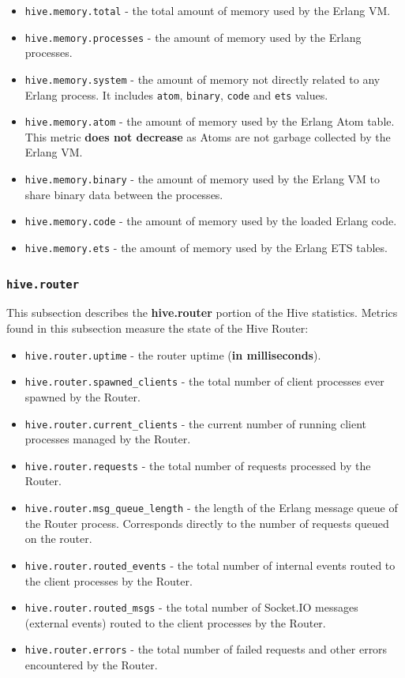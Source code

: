 \documentclass[a4paper]{article}
\begin{document}
\begin{itemize}
\item \texttt{hive.memory.total} - the total amount of memory used by the Erlang VM.
\item \texttt{hive.memory.processes} - the amount of memory used by the Erlang processes.
\item \texttt{hive.memory.system} - the amount of memory not directly related to any Erlang process. It includes \texttt{atom}, \texttt{binary}, \texttt{code} and \texttt{ets} values.
\item \texttt{hive.memory.atom} - the amount of memory used by the Erlang Atom table. This metric \textbf{does not decrease} as Atoms are not garbage collected by the Erlang VM.
\item \texttt{hive.memory.binary} - the amount of memory used by the Erlang VM to share binary data between the processes.
\item \texttt{hive.memory.code} - the amount of memory used by the loaded Erlang code.
\item \texttt{hive.memory.ets} - the amount of memory used by the Erlang ETS tables.
\end{itemize}
\subsubsection{\texttt{hive.router}}
\label{sec-4-2-3}

This subsection describes the \textbf{hive.router} portion of the Hive statistics. Metrics found in this subsection measure the state of the Hive Router:


\begin{itemize}
\item \texttt{hive.router.uptime} - the router uptime (\textbf{in milliseconds}).
\item \texttt{hive.router.spawned\_clients} - the total number of client processes ever spawned by the Router.
\item \texttt{hive.router.current\_clients} - the current number of running client processes managed by the Router.
\item \texttt{hive.router.requests} - the total number of requests processed by the Router.
\item \texttt{hive.router.msg\_queue\_length} - the length of the Erlang message queue of the Router process. Corresponds directly to the number of requests queued on the router.
\item \texttt{hive.router.routed\_events} - the total number of internal events routed to the client processes by the Router.
\item \texttt{hive.router.routed\_msgs} - the total number of Socket.IO messages (external events) routed to the client processes by the Router.
\item \texttt{hive.router.errors} - the total number of failed requests and other errors encountered by the Router.
\end{itemize}
\end{document}
